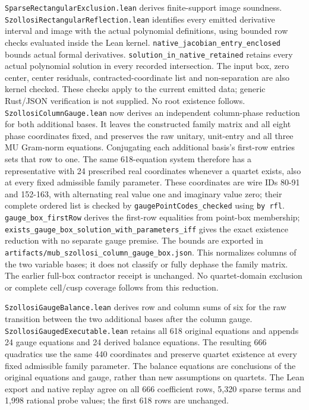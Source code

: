 \documentclass[
]{article}
\begin{document}
\nolinkurl{SparseRectangularExclusion.lean} derives finite-support image
soundness. \nolinkurl{SzollosiRectangularReflection.lean} identifies
every emitted derivative interval and image with the actual polynomial
definitions, using bounded row checks evaluated inside the Lean kernel.
\nolinkurl{native_jacobian_entry_enclosed} bounds actual formal
derivatives. \nolinkurl{solution_in_native_retained} retains every
actual polynomial solution in every recorded intersection. The input
box, zero center, center residuals, contracted-coordinate list and
non-separation are also kernel checked. These checks apply to the
current emitted data; generic Rust/JSON verification is not supplied. No
root existence follows. \nolinkurl{SzollosiColumnGauge.lean} now derives
an independent column-phase reduction for both additional bases. It
leaves the constructed family matrix and all eight phase coordinates
fixed, and preserves the raw unitary, unit-entry and all three MU
Gram-norm equations. Conjugating each additional basis's first-row
entries sets that row to one. The same 618-equation system therefore has
a representative with 24 prescribed real coordinates whenever a quartet
exists, also at every fixed admissible family parameter. These
coordinates are wire IDs 80-91 and 152-163, with alternating real value
one and imaginary value zero; their complete ordered list is checked by
\nolinkurl{gaugePointCodes_checked} using \nolinkurl{by rfl}.
\nolinkurl{gauge_box_firstRow} derives the first-row equalities from
point-box membership;
\nolinkurl{exists_gauge_box_solution_with_parameters_iff} gives the
exact existence reduction with no separate gauge premise. The bounds are
exported in \nolinkurl{artifacts/mub_szollosi_column_gauge_box.json}.
This normalizes columns of the two variable bases; it does not classify
or fully dephase the family matrix. The earlier full-box contractor
receipt is unchanged. No quartet-domain exclusion or complete cell/cusp
coverage follows from this reduction.

\nolinkurl{SzollosiGaugeBalance.lean} derives row and column sums of six
for the raw transition between the two additional bases after the column
gauge. \nolinkurl{SzollosiGaugedExecutable.lean} retains all 618
original equations and appends 24 gauge equations and 24 derived balance
equations. The resulting 666 quadratics use the same 440 coordinates and
preserve quartet existence at every fixed admissible family parameter.
The balance equations are conclusions of the original equations and
gauge, rather than new assumptions on quartets. The Lean export and
native replay agree on all 666 coefficient rows, 5,320 sparse terms and
1,998 rational probe values; the first 618 rows are unchanged.
\end{document}
